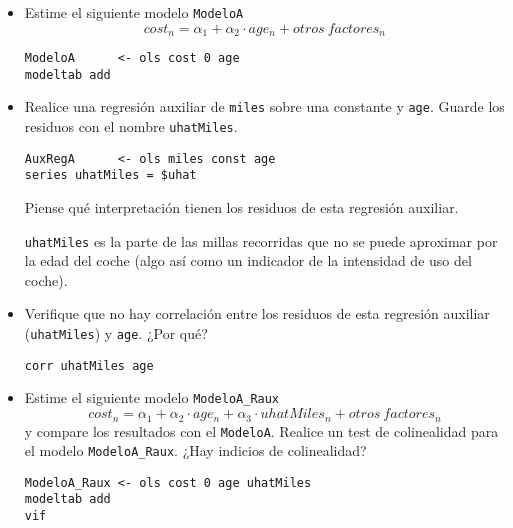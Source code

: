 \documentclass[11pt]{article}
\begin{document}
\begin{itemize}
\item Estime el siguiente modelo \texttt{ModeloA}
\begin{displaymath}
  cost_{n} = \alpha_1 + \alpha_2\cdot age_n +  otros\ factores_n
\end{displaymath}
{\vspace{0pt} \color{gray!70!black}
\begin{verbatim}
ModeloA      <- ols cost 0 age
modeltab add
\end{verbatim}
}

\item Realice una regresión auxiliar de \texttt{miles} sobre una constante y
\texttt{age}. Guarde los residuos con el nombre \texttt{uhatMiles}.
{\vspace{0pt} \color{gray!70!black}
\begin{verbatim}
AuxRegA      <- ols miles const age
series uhatMiles = $uhat
\end{verbatim}
}

Piense qué interpretación tienen los residuos de esta regresión
auxiliar.

{\color{gray!70!black} \small
\texttt{uhatMiles} es la parte de las millas recorridas que no se
puede aproximar por la edad del coche (algo así como un indicador de
la intensidad de uso del coche).
}

\item Verifique que no hay correlación entre los residuos de esta
regresión auxiliar (\texttt{uhatMiles}) y \texttt{age}. ¿Por qué?
{\vspace{0pt} \color{gray!70!black}
\begin{verbatim}
corr uhatMiles age
\end{verbatim}
}

\item Estime el siguiente modelo \texttt{ModeloA\_Raux}
\begin{displaymath}
  cost_{n} = \alpha_1 + \alpha_2\cdot age_n +  \alpha_3\cdot uhatMiles_n + otros\ factores_n
\end{displaymath}
y compare los resultados con el \texttt{ModeloA}. Realice un test de
colinealidad para el modelo \texttt{ModeloA\_Raux}. ¿Hay indicios de
colinealidad?
{\vspace{0pt} \color{gray!70!black}
\begin{verbatim}
ModeloA_Raux <- ols cost 0 age uhatMiles
modeltab add
vif
\end{verbatim}
}


\end{itemize}
\end{document}
